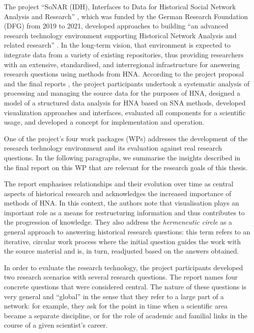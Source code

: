 The project \enquote{SoNAR (IDH),
Interfaces to Data for Historical Social Network Analysis
and Research} \autocite{Bludau2020,Menzel2020,SoNAR},
which was funded by the German Research Foundation (DFG)
from 2019 to 2021,
developed approaches to building 
\enquote{an advanced research technology environment
supporting Historical Network Analysis and related research} \autocite{SoNAR}.
In the long-term vision, that environment is expected to
integrate data from a variety of existing repositories,
thus providing researchers with an extensive,
standardised, and interregional infrastructure for answering research questions
using methods from \gls{HNA}.
According to the project proposal and the final reports \autocite{SoNARreports},
the project participants undertook
a systematic analysis of processing and managing the source data
for the purposes of \gls{HNA},
designed a model of a structured data analysis for \gls{HNA} based on \gls{SNA} methods,
developed visualization approaches and interfaces,
evaluated all components for a scientific usage,
and developed a concept for implementation and operation.

One of the project's four work packages (WPs)
addresses the development of the research technology environment
and its evaluation against real research questions.
In the following paragraphs,
we summarise the insights described in the final report on this WP \autocite{Fangerau2022}
that are relevant for the research goals of this thesis.

The report emphasises relationships and their evolution over time
as central aspects of historical research and acknowledges the increased 
importance of methods of \gls{HNA}. In this context, the authors note that visualisation plays an important role
as a means for restructuring information and thus contributes to the progression of knowledge.
They also address the \emph{hermeneutic circle} \autocite{Malpas2015}
as a general approach to answering historical research questions:
this term refers to an iterative, circular work process
where the initial question guides the work with the source material
and is, in turn, readjusted based on the answers obtained.

In order to evaluate the research technology,
the project participants developed two research scenarios
with several research questions.
The report names four concrete questions that were considered central.
The nature of these questions is very general and \enquote{global}
in the sense that they refer to a large part of a network:
for example, they ask for the point in time when a scientific area became a separate discipline,
or for the role of academic and familial links in the course of a given scientist's career.

